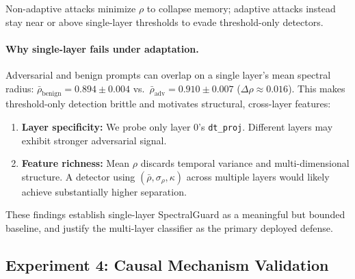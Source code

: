 \documentclass[10pt,twocolumn]{article}
\begin{document}
\begin{table}[t]
\centering
\caption{Mean spectral radius by attack regime (narrative disambiguation).}
\label{tab:rho_regimes}
\small
{}
\vspace{2pt}
\begin{minipage}{\columnwidth}
{\footnotesize Non-adaptive attacks minimize $\rho$ to collapse memory; adaptive attacks instead stay near or above single-layer thresholds to evade threshold-only detectors.}
\end{minipage}
\end{table}

\paragraph{Why single-layer fails under adaptation.}
Adversarial and benign prompts can overlap on a single layer's mean spectral radius: $\bar{\rho}_{\text{benign}}=0.894 \pm 0.004$ vs.~$\bar{\rho}_{\text{adv}}=0.910 \pm 0.007$ ($\Delta\rho \approx 0.016$). This makes threshold-only detection brittle and motivates structural, cross-layer features:
\begin{enumerate}
\item \textbf{Layer specificity:} We probe only layer 0's \texttt{dt\_proj}. Different layers may exhibit stronger adversarial signal.
\item \textbf{Feature richness:} Mean $\rho$ discards temporal variance and multi-dimensional structure. A detector using $(\bar{\rho}, \sigma_\rho, \kappa)$ across multiple layers would likely achieve substantially higher separation.
\end{enumerate}
These findings establish single-layer SpectralGuard as a meaningful but bounded baseline, and justify the multi-layer classifier as the primary deployed defense.

\subsection{Experiment 4: Causal Mechanism Validation}
\label{sec:causal_validation_results}
\label{sec:exp4}
\end{document}
